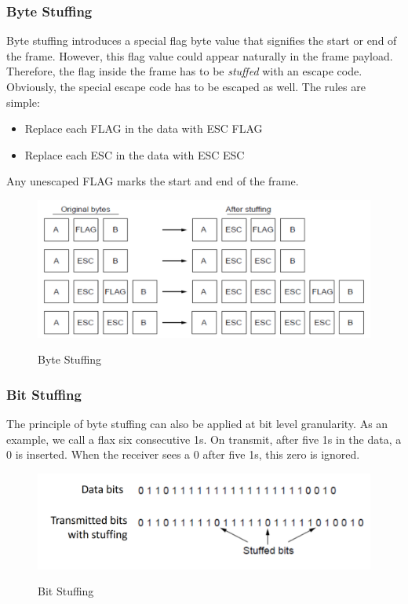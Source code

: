\subsubsection{Byte Stuffing}
Byte stuffing introduces a special flag byte value that signifies the start or end of the frame. However, this flag value could appear naturally in the frame payload. Therefore, the flag inside the frame has to be \textit{stuffed} with an escape code. Obviously, the special escape code has to be escaped as well. The rules are simple:
\begin{itemize}
\item Replace each FLAG in the data with ESC FLAG
\item Replace each ESC in the data with ESC ESC
\end{itemize}
Any unescaped FLAG marks the start and end of the frame.
\begin{figure}[H]
\centering
\includegraphics[width=.6\textwidth]{images/byte_stuffing.PNG}
\label{byte_stuffing}
\caption{Byte Stuffing}
\end{figure}

\subsubsection{Bit Stuffing}
The principle of byte stuffing can also be applied at bit level granularity. As an example, we call a flax six consecutive 1s. On transmit, after five 1s in the data, a 0 is inserted. When the receiver sees a 0 after five 1s, this zero is ignored.
\begin{figure}[H]
\centering
\includegraphics[width=.7\textwidth]{images/bit_stuffing.PNG}
\label{bit_stuffing}
\caption{Bit Stuffing}
\end{figure}



